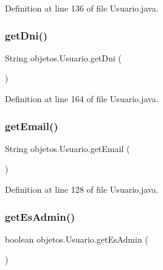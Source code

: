 Definition at line 136 of file Usuario.\+java.

\mbox{\label{classobjetos_1_1_usuario_a35aa11d09cd9caa12bb4e2445fe36c1f}} 
\subsubsection{\texorpdfstring{get\+Dni()}{getDni()}}
{\footnotesize\ttfamily String objetos.\+Usuario.\+get\+Dni (\begin{DoxyParamCaption}{ }\end{DoxyParamCaption})}



Definition at line 164 of file Usuario.\+java.

\mbox{\label{classobjetos_1_1_usuario_a504d7bcb1c63297b870f8499b88381d1}} 
\subsubsection{\texorpdfstring{get\+Email()}{getEmail()}}
{\footnotesize\ttfamily String objetos.\+Usuario.\+get\+Email (\begin{DoxyParamCaption}{ }\end{DoxyParamCaption})}



Definition at line 128 of file Usuario.\+java.

\mbox{\label{classobjetos_1_1_usuario_a110d1f830d1c6041f1ee78c5bd32395d}} 
\subsubsection{\texorpdfstring{get\+Es\+Admin()}{getEsAdmin()}}
{\footnotesize\ttfamily boolean objetos.\+Usuario.\+get\+Es\+Admin (\begin{DoxyParamCaption}{ }\end{DoxyParamCaption})}



